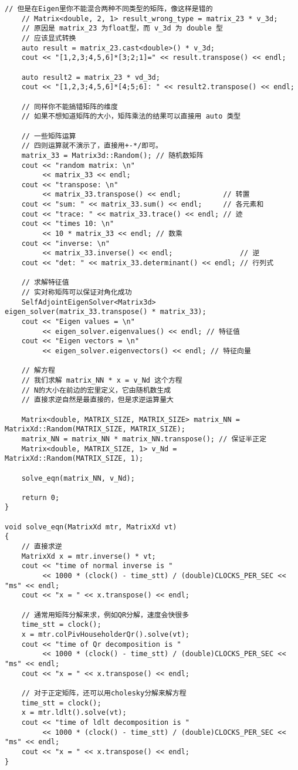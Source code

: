 \begin{lstlisting}[style=C++]
    // 但是在Eigen里你不能混合两种不同类型的矩阵，像这样是错的
    // Matrix<double, 2, 1> result_wrong_type = matrix_23 * v_3d;
    // 原因是 matrix_23 为float型，而 v_3d 为 double 型
    // 应该显式转换
    auto result = matrix_23.cast<double>() * v_3d;
    cout << "[1,2,3;4,5,6]*[3;2;1]=" << result.transpose() << endl;

    auto result2 = matrix_23 * vd_3d;
    cout << "[1,2,3;4,5,6]*[4;5;6]: " << result2.transpose() << endl;

    // 同样你不能搞错矩阵的维度
    // 如果不想知道矩阵的大小，矩阵乘法的结果可以直接用 auto 类型

    // 一些矩阵运算
    // 四则运算就不演示了，直接用+-*/即可。
    matrix_33 = Matrix3d::Random(); // 随机数矩阵
    cout << "random matrix: \n"
         << matrix_33 << endl;
    cout << "transpose: \n"
         << matrix_33.transpose() << endl;          // 转置
    cout << "sum: " << matrix_33.sum() << endl;     // 各元素和
    cout << "trace: " << matrix_33.trace() << endl; // 迹
    cout << "times 10: \n"
         << 10 * matrix_33 << endl; // 数乘
    cout << "inverse: \n"
         << matrix_33.inverse() << endl;                // 逆
    cout << "det: " << matrix_33.determinant() << endl; // 行列式

    // 求解特征值
    // 实对称矩阵可以保证对角化成功
    SelfAdjointEigenSolver<Matrix3d> eigen_solver(matrix_33.transpose() * matrix_33);
    cout << "Eigen values = \n"
         << eigen_solver.eigenvalues() << endl; // 特征值
    cout << "Eigen vectors = \n"
         << eigen_solver.eigenvectors() << endl; // 特征向量

    // 解方程
    // 我们求解 matrix_NN * x = v_Nd 这个方程
    // N的大小在前边的宏里定义，它由随机数生成
    // 直接求逆自然是最直接的，但是求逆运算量大

    Matrix<double, MATRIX_SIZE, MATRIX_SIZE> matrix_NN = MatrixXd::Random(MATRIX_SIZE, MATRIX_SIZE);
    matrix_NN = matrix_NN * matrix_NN.transpose(); // 保证半正定
    Matrix<double, MATRIX_SIZE, 1> v_Nd = MatrixXd::Random(MATRIX_SIZE, 1);

    solve_eqn(matrix_NN, v_Nd);

    return 0;
}

void solve_eqn(MatrixXd mtr, MatrixXd vt)
{
    // 直接求逆
    MatrixXd x = mtr.inverse() * vt;
    cout << "time of normal inverse is "
         << 1000 * (clock() - time_stt) / (double)CLOCKS_PER_SEC << "ms" << endl;
    cout << "x = " << x.transpose() << endl;

    // 通常用矩阵分解来求，例如QR分解，速度会快很多
    time_stt = clock();
    x = mtr.colPivHouseholderQr().solve(vt);
    cout << "time of Qr decomposition is "
         << 1000 * (clock() - time_stt) / (double)CLOCKS_PER_SEC << "ms" << endl;
    cout << "x = " << x.transpose() << endl;

    // 对于正定矩阵，还可以用cholesky分解来解方程
    time_stt = clock();
    x = mtr.ldlt().solve(vt);
    cout << "time of ldlt decomposition is "
         << 1000 * (clock() - time_stt) / (double)CLOCKS_PER_SEC << "ms" << endl;
    cout << "x = " << x.transpose() << endl;
}
\end{lstlisting}